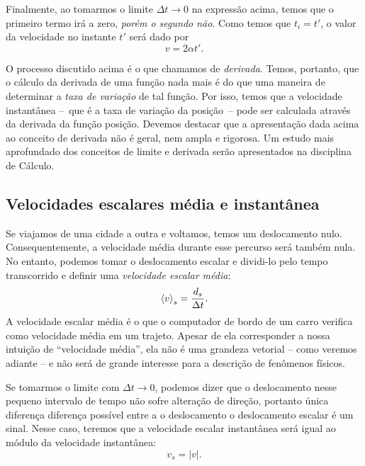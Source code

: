 Finalmente, ao tomarmos o limite $\Delta t \to 0$ na expressão acima, temos que o primeiro termo irá a zero, \emph{porém o segundo não}. Como temos que $t_i = t'$, o valor da velocidade no instante $t'$ será dado por
\begin{equation}
    v = 2\alpha t'.
\end{equation}

O processo discutido acima é o que chamamos de \emph{derivada}. Temos, portanto, que  o cálculo da derivada de uma função nada mais é do que uma maneira de determinar a \emph{taxa de variação} de tal função. Por isso, temos que a velocidade instantânea --~que é a taxa de variação da posição~-- pode ser calculada através da derivada da função posição. Devemos destacar que a apresentação dada acima ao conceito de derivada não é geral, nem ampla e rigorosa. Um estudo mais aprofundado dos conceitos de limite e derivada serão apresentados na disciplina de Cálculo.

\subsection{Velocidades escalares média e instantânea}

Se viajamos de uma cidade a outra e voltamos, temos um deslocamento nulo. Consequentemente, a velocidade média durante esse percurso será também nula. No entanto, podemos tomar o deslocamento escalar e dividi-lo pelo tempo transcorrido e definir uma \emph{velocidade escalar média}:
\begin{equation}
  \left\langle{v}\right\rangle_s = \frac{d_s}{\Delta t}.
\end{equation}
%
A velocidade escalar média é o que o computador de bordo de um carro verifica como velocidade média em um trajeto. Apesar de ela corresponder a nossa intuição de ``velocidade média'', ela não é uma grandeza vetorial -- como veremos adiante -- e não será de grande interesse para a descrição de fenômenos físicos.

Se tomarmos o limite com $\Delta t \to 0$, podemos dizer que o deslocamento nesse pequeno intervalo de tempo não sofre alteração de direção, portanto única diferença diferença possível entre a o deslocamento o deslocamento escalar é um sinal. Nesse caso, teremos que a velocidade escalar instantânea será igual ao módulo da velocidade instantânea:
\begin{equation}
  v_s = |v|.
\end{equation}

